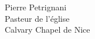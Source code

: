
{\itshape

\lipsum

\begin{flushright}
Pierre Petrignani\\
Pasteur de l'église\\
Calvary Chapel de Nice
\end{flushright}

}
\closechapter[prefaceend]



